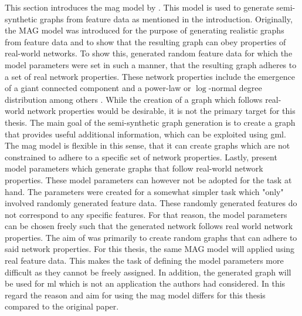 	This section introduces the \acf{mag} model by \cite{kim2012multiplicative}. 
	This model is used to generate semi-synthetic graphs from feature data as 
	mentioned in the introduction. Originally, the MAG model was introduced for 
	the purpose of generating realistic graphs from feature data and to show that 
	the resulting graph can obey properties of real-world networks. To show this, 
	\citeauthor{kim2012multiplicative} generated random feature data for which 
	the model parameters were set in such a manner, that the resulting graph 
	adheres to a set of real network properties. These network properties 
	include the emergence of a giant connected component and a power-law or 
	$\log$-normal degree distribution among others 
	\citep[p. 113]{kim2012multiplicative}. While the creation of a graph which 
	follows real-world network properties would be desirable, it is not the 
	primary target for this thesis. The main goal of the semi-synthetic graph 
	generation is to create a graph that provides useful additional information, 
	which can be exploited using \acs{gml}. The \acs{mag} model is flexible in 
	this sense, that it can create graphs which are not constrained to adhere to 
	a specific set of network properties. Lastly, 
	\citeauthor{kim2012multiplicative} 
	\citeyearpar[p. 138-139]{kim2012multiplicative} present model parameters 
	which generate graphs that follow real-world network properties. These model 
	parameters can however not be adopted for the task at hand. The parameters 
	were created for a somewhat simpler task which "only" involved randomly 
	generated feature data. These randomly generated features do not correspond
	to any specific features. For that reason, the model parameters can be
	chosen freely such that the generated network follows real world network
	properties. The aim of \citeauthor{kim2012multiplicative} was primarily to
	create random graphs that can adhere to said network properties. For this
	thesis, the same MAG model will applied using real feature data. This makes
	the task of defining the model parameters more difficult as they cannot be
	freely assigned. In addition, the generated graph will be used for \acs{ml} 
	which is not an application the authors had considered. In this regard the 
	reason and aim for using the \acs{mag} model differs for this thesis 
	compared to the original paper. \\

